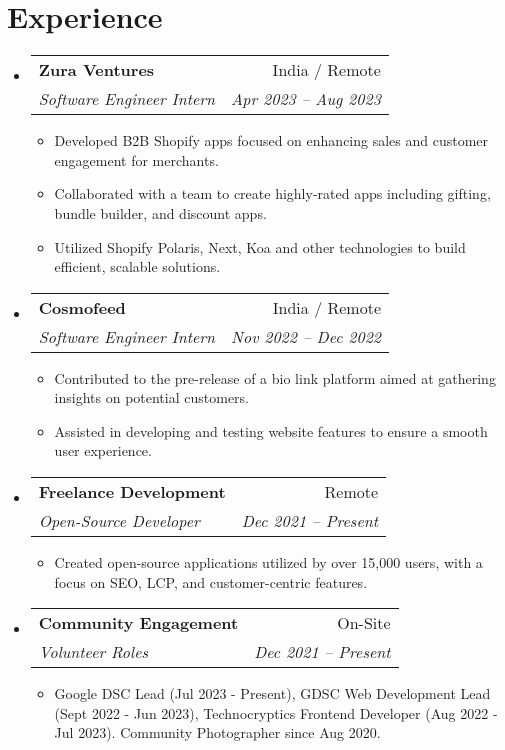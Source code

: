 \documentclass[letterpaper,11pt]{article}
\makeatletter
\newcommand{\resumeItem}[1]{
  \item\small{
    {#1 \vspace{-2pt}}
  }
}
\newcommand{\resumeSubheading}[4]{
  \vspace{-2pt}\item
    \begin{tabular*}{0.97\textwidth}[t]{l@{\extracolsep{\fill}}r}
      \textbf{#1} & #2 \\
      \textit{\small#3} & \textit{\small #4} \\
    \end{tabular*}\vspace{-7pt}
}
\newcommand{\resumeSubHeadingListStart}{\begin{itemize}[leftmargin=0.15in, label={}]}
\newcommand{\resumeSubHeadingListEnd}{\end{itemize}}
\newcommand{\resumeItemListStart}{\begin{itemize}}
\newcommand{\resumeItemListEnd}{\end{itemize}\vspace{-5pt}}
\makeatother
\begin{document}


\section{Experience}
    \resumeSubHeadingListStart
    
    \resumeSubheading{Zura Ventures}{India / Remote}
    {Software Engineer Intern}{Apr 2023 -- Aug 2023}
    \resumeItemListStart
    \resumeItem{Developed B2B Shopify apps focused on enhancing sales and customer engagement for merchants.}
    \resumeItem{Collaborated with a team to create highly-rated apps including gifting, bundle builder, and discount apps.}
    \resumeItem{Utilized Shopify Polaris, Next, Koa and other  technologies to build efficient, scalable solutions.}
    \resumeItemListEnd
    
    \resumeSubheading{Cosmofeed}{India / Remote}
    {Software Engineer Intern}{Nov 2022 -- Dec 2022}
    \resumeItemListStart
    \resumeItem{Contributed to the pre-release of a bio link platform aimed at gathering insights on potential customers.}
    \resumeItem{Assisted in developing and testing website features to ensure a smooth user experience.}
    \resumeItemListEnd
    
    \resumeSubheading{Freelance Development}{Remote}{Open-Source Developer}{Dec 2021 -- Present}
    \resumeItemListStart
    \resumeItem{Created open-source applications utilized by over 15,000 users, with a focus on SEO, LCP, and customer-centric features.}
    \resumeItemListEnd

    \resumeSubheading{Community Engagement}{On-Site}{Volunteer Roles}{Dec 2021 -- Present}
    \resumeItemListStart
    \resumeItem{Google DSC Lead (Jul 2023 - Present), GDSC Web Development Lead (Sept 2022 - Jun 2023), Technocryptics Frontend Developer (Aug 2022 - Jul 2023). Community Photographer since Aug 2020.}
    \resumeItemListEnd

    \resumeSubHeadingListEnd

\end{document}
